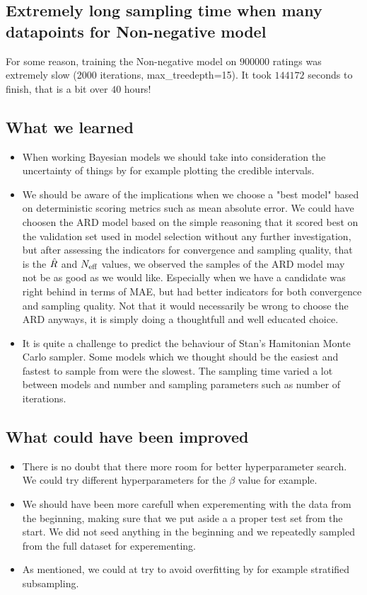 \documentclass[12pt]{article}
\begin{document}
    \subsection*{Extremely long sampling time when many datapoints for Non-negative model}
    For some reason, training the Non-negative model on $900000$ ratings was extremely slow (2000 iterations, max\_treedepth=15). It took $144172$ seconds to finish, that is a bit over $40$ hours! 

    \subsection*{What we learned}
    \begin{itemize}
        \item When working Bayesian models we should take into consideration the uncertainty of things by for example plotting the credible intervals. 
        \item We should be aware of the implications when we choose a "best model" based on deterministic scoring metrics such as mean absolute error. We could have choosen the ARD model based on the simple reasoning that it scored best on the validation set used in model selection without any further investigation, but after assessing the indicators for convergence and sampling quality, that is the $\hat{R}$ and $N_{\text{eff}}$ values, we observed the samples of the ARD model may not be as good as we would like. Especially when we have a candidate was right behind in terms of MAE, but had better indicators for both convergence and sampling quality. Not that it would necessarily be wrong to choose the ARD anyways, it is simply doing a thoughtfull and well educated choice.
        \item It is quite a challenge to predict the behaviour of Stan's Hamitonian Monte Carlo sampler. Some models which we thought should be the easiest and fastest to sample from were the slowest. The sampling time varied a lot between models and number and sampling parameters such as number of iterations. 
    \end{itemize}

    \subsection*{What could have been improved}
    \begin{itemize}
        \item There is no doubt that there more room for better hyperparameter search. We could try different hyperparameters for the $\beta$ value for example.
        \item We should have been more carefull when experementing with the data from the beginning, making sure that we put aside a a proper test set from the start. We did not seed anything in the beginning and we repeatedly sampled from the full dataset for experementing. 
        \item As mentioned, we could at try to avoid overfitting by for example stratified subsampling.
    \end{itemize}
\end{document}

